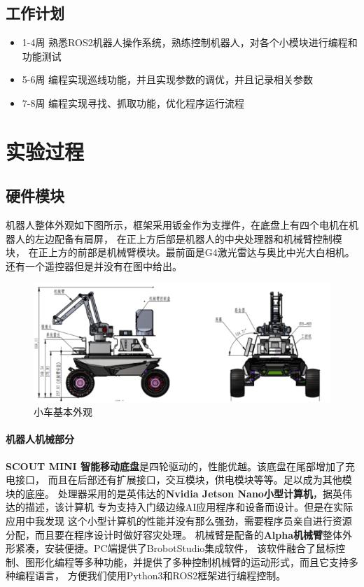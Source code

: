 \documentclass[a4paper,twoside]{article}
\begin{document}
\subsection{工作计划}
\begin{itemize}
	\item 1-4周 \quad 熟悉ROS2机器人操作系统，熟练控制机器人，对各个小模块进行编程和功能测试
	\item 5-6周 \quad 编程实现巡线功能，并且实现参数的调优，并且记录相关参数
	\item 7-8周 \quad 编程实现寻找、抓取功能，优化程序运行流程
\end{itemize}
\newpage
\section{实验过程}
\subsection{硬件模块}
机器人整体外观如下图所示，框架采用钣金作为支撑件，在底盘上有四个电机在机器人的左边配备有肩屏，
在正上方后部是机器人的中央处理器和机械臂控制模块，
在正上方的前部是机械臂模块。最前面是G4激光雷达与奥比中光大白相机。
还有一个遥控器但是并没有在图中给出。
\begin{figure}[htbp]
	\begin{center}
		\includegraphics*[width=0.9\linewidth]{robothardware.png}
		\caption{小车基本外观}
	\end{center}
\end{figure}
\paragraph{机器人机械部分}
\textbf{SCOUT MINI 智能移动底盘}是四轮驱动的，性能优越。该底盘在尾部增加了充电接口，
而且在后部还有扩展接口，交互模块，供电模块等等。足以成为其他模块的底座。
处理器采用的是英伟达的\textbf{Nvidia Jetson Nano小型计算机}，据英伟达的描述，该计算机
专为支持入门级边缘AI应用程序和设备而设计。但是在实际应用中我发现
这个小型计算机的性能并没有那么强劲，需要程序员亲自进行资源分配，而且要在程序设计时做好容灾处理。
机械臂是配备的\textbf{Alpha机械臂}整体外形紧凑，安装便捷。PC端提供了BrobotStudio集成软件，
该软件融合了鼠标控制、图形化编程等多种功能，并提供了多种控制机械臂的运动形式，而且它支持多种编程语言，
方便我们使用Python3和ROS2框架进行编程控制。
\end{document}
